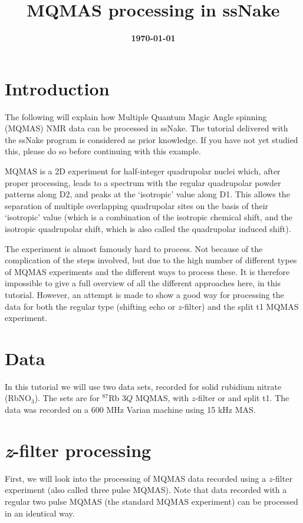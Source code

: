 \documentclass[11pt,a4paper]{article}
\title{\color{black}\fontfamily{SourceSansPro-LF}\bfseries MQMAS processing in ssNake}
\author{}
\date{\color{black}\fontfamily{SourceSansPro-LF}\bfseries \today}
\begin{document}

\maketitle

\section{Introduction}
The following will explain how Multiple Quantum Magic Angle spinning (MQMAS) NMR data can be processed in ssNake.
 The
tutorial delivered with the ssNake program is considered as prior knowledge. If you have not yet
studied this, please do so before continuing with this example.

MQMAS is a 2D experiment for half-integer quadrupolar nuclei which, after proper processing, leads to a spectrum with the regular
quadrupolar powder patterns along D2, and peaks at the `isotropic' value along D1. This allows the
separation of multiple overlapping quadrupolar sites on the basis of their `isotropic' value (which
is a combination of the isotropic chemical shift, and the isotropic quadrupolar shift, which is also called
the quadrupolar induced shift). 

The experiment is almost famously hard to process. Not because of
the complication of the steps involved, but due to the high number of different types of MQMAS experiments
and the different ways to process these. It is therefore impossible to give a full overview of all
the different approaches here, in this tutorial. However, an attempt is made to show a good way for
processing the data for both the regular type (shifting echo or $z$-filter) and the split t1 MQMAS
experiment.


\section{Data}
In this tutorial we will use two data sets, recorded for solid rubidium nitrate (RbNO$_3$). The
sets are for $^{87}$Rb $3Q$ MQMAS, with $z$-filter or and split t1. The
data was recorded on a 600 MHz Varian machine using 15 kHz MAS.


\section{\textit{z}-filter processing}
First, we will look into the processing of MQMAS data recorded using a $z$-filter experiment (also
called three pulse MQMAS). Note that data recorded with a regular two pulse MQMAS (the standard
MQMAS experiment) can be processed in an identical way.
\end{document}
